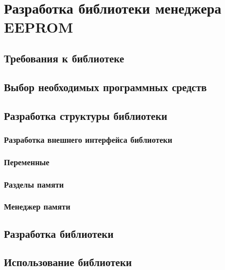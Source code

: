 \chapter{Разработка библиотеки менеджера EEPROM}

\section{Требования к библиотеке}

\section{Выбор необходимых программных средств}

\section{Разработка структуры библиотеки}

\subsection{Разработка внешнего интерфейса библиотеки}

\subsection{Переменные}

\subsection{Разделы памяти}

\subsection{Менеджер памяти}

\section{Разработка библиотеки}

\section{Использование библиотеки}
